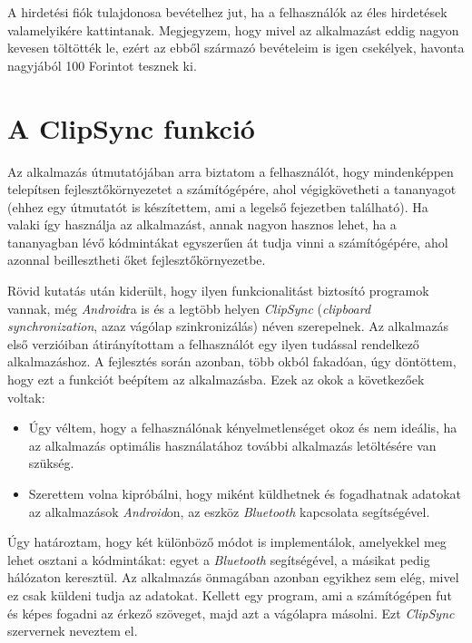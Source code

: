 \documentclass[12pt,a4paper]{article}
\begin{document}
	A hirdetési fiók tulajdonosa bevételhez jut, ha a felhasználók az éles hirdetések valamelyikére kattintanak. Megjegyzem, hogy mivel az alkalmazást eddig nagyon kevesen töltötték le, ezért az ebből származó bevételeim is igen csekélyek, havonta nagyjából 100 Forintot tesznek ki.

	\section{A ClipSync funkció}\label{clipsync}
	
	Az alkalmazás útmutatójában arra biztatom a felhasználót, hogy mindenképpen telepítsen fejlesztőkörnyezetet a számítógépére, ahol végigkövetheti a tananyagot (ehhez egy útmutatót is készítettem, ami a legelső fejezetben található). Ha valaki így használja az alkalmazást, annak nagyon hasznos lehet, ha a tananyagban lévő kódmintákat egyszerűen át tudja vinni a számítógépére, ahol azonnal beillesztheti őket fejlesztőkörnyezetbe.
	
	Rövid kutatás után kiderült, hogy ilyen funkcionalitást biztosító programok vannak, még \textit{Android}ra is és a legtöbb helyen \textit{ClipSync} (\textit{clipboard synchronization}, azaz vágólap szinkronizálás) néven szerepelnek. Az alkalmazás első verzióiban átirányítottam a 
	felhasználót egy ilyen tudással rendelkező alkalmazáshoz. A fejlesztés során azonban, több okból fakadóan, úgy döntöttem, hogy ezt a funkciót beépítem az alkalmazásba. Ezek az okok a következőek voltak:
	
	\begin{itemize}
		\item Úgy véltem, hogy a felhasználónak kényelmetlenséget okoz és nem ideális, ha az alkalmazás optimális használatához további alkalmazás letöltésére van szükség.
		\item Szerettem volna kipróbálni, hogy miként küldhetnek és fogadhatnak adatokat az alkalmazások \textit{Android}on, az eszköz \textit{Bluetooth} kapcsolata segítségével.
	\end{itemize} 
	
	Úgy határoztam, hogy két különböző módot is implementálok, amelyekkel meg lehet osztani a kódmintákat: egyet a \textit{Bluetooth} segítségével, a másikat pedig hálózaton keresztül. Az alkalmazás önmagában azonban egyikhez sem elég, mivel ez csak küldeni tudja az adatokat. Kellett egy program, ami a számítógépen fut és képes fogadni az érkező szöveget, majd azt a vágólapra másolni. Ezt \textit{ClipSync} szervernek neveztem el.
	
\end{document}
